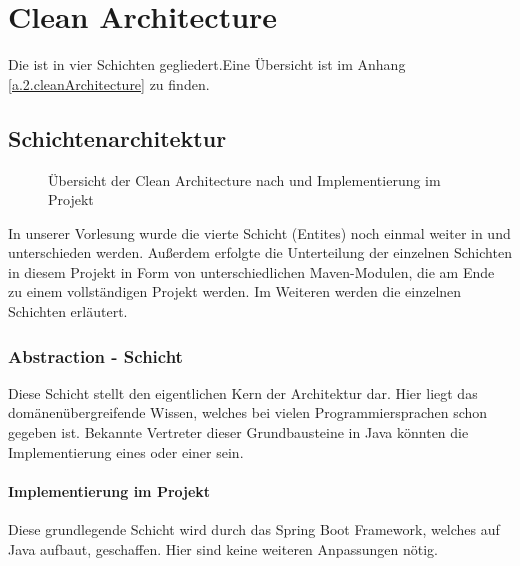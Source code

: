 
\chapter{Clean Architecture} \label{2.cleanArchitecture}
Die  ist in vier Schichten gegliedert.Eine Übersicht ist im Anhang \cref{a.2.cleanArchitecture} zu finden.

	\section{Schichtenarchitektur}
	\begin{figure}[h]
		\centering
		\caption{Übersicht der Clean Architecture nach \cite{cleanArchitecture.dostmann} und Implementierung im Projekt}
		\label{2.cleanArchitecture}
	\end{figure}
	In unserer Vorlesung wurde die vierte Schicht (Entites) noch einmal weiter in  und  unterschieden werden. Außerdem erfolgte die Unterteilung der einzelnen Schichten in diesem Projekt in Form von unterschiedlichen Maven-Modulen, die am Ende zu einem vollständigen Projekt  werden. Im Weiteren werden die einzelnen Schichten erläutert.

	\newpage

		\subsection{Abstraction - Schicht}
		Diese Schicht stellt den eigentlichen Kern der Architektur dar. Hier liegt das domänenübergreifende Wissen, welches bei vielen Programmiersprachen schon gegeben ist. Bekannte Vertreter dieser Grundbausteine in Java könnten die Implementierung eines  oder einer  sein.
			\subsubsection{Implementierung im Projekt}
			Diese grundlegende Schicht wird durch das Spring Boot Framework, welches auf Java aufbaut, geschaffen. Hier sind keine weiteren Anpassungen nötig.
		
